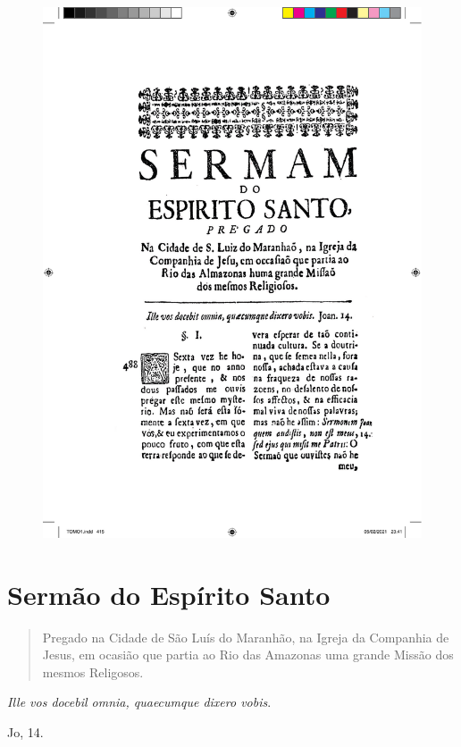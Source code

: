 \pagebreak
\thispagestyle{empty}
\movetoevenpage
\begin{figure}
\includegraphics[width=\textwidth]{./imgs/espirito.pdf}  
\end{figure}

\chapter{Sermão do Espírito Santo}

\begin{quotation}
\noindent{}Pregado na Cidade de São Luís do Maranhão, na Igreja da Companhia de Jesus,
em ocasião que partia ao Rio das Amazonas uma grande Missão dos mesmos Religosos.
\end{quotation}

\epigraph{\emph{Ille vos docebil omnia, quaecumque dixero vobis}.}{Jo, 14.}


